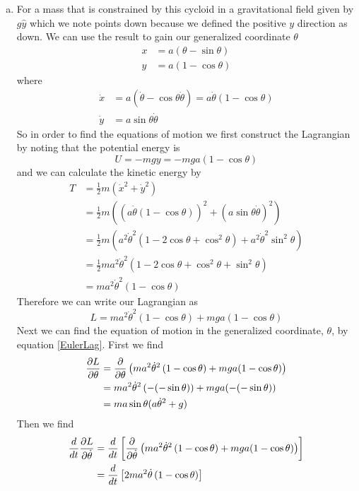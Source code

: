 \documentclass[11pt]{article}
\numberwithin{equation}{section}
\begin{document}
\begin{enumerate}[(a)]
\item For a mass that is constrained by this cycloid in a gravitational field given by
$g\hat{y}$ which we note points down because we defined the positive $y$ direction as 
down. We can use the result to gain our generalized coordinate $\theta$
\begin{align*}
x &=  a(\theta-\sin\theta)\\
y &=  a(1-\cos\theta)
\end{align*}
where
\begin{align*}
\dot{x} &=  a(\dot{\theta}-\cos\theta\dot{\theta}) =  a\dot{\theta}(1-\cos\theta)\\
\dot{y} &=  a\sin\theta\dot{\theta} 
\end{align*}
So in order to find the equations of motion we first construct the Lagrangian by noting that
the potential energy is
$$U = -mgy = -mga(1-\cos\theta)$$
and we can calculate the kinetic energy by
\begin{align*}
T &= \frac{1}{2}m\left(\dot{x}^2+\dot{y}^2\right)\\
&= \frac{1}{2}m\left((a\dot{\theta}(1-\cos\theta))^2+(a\sin\theta\dot{\theta})^2\right)\\
&= \frac{1}{2}m\left(a^2\dot{\theta}^2(1-2\cos\theta+\cos^2\theta)+a^2\dot{\theta}^2\sin^2\theta\right)\\
&= \frac{1}{2}ma^2\dot{\theta}^2\left(1-2\cos\theta+\cos^2\theta+\sin^2\theta\right)\\
&= ma^2\dot{\theta}^2\left(1-\cos\theta\right)
\end{align*}
Therefore we can write our Lagrangian as
$$L = ma^2\dot{\theta}^2\left(1-\cos\theta\right) + mga(1-\cos\theta)$$
Next we can find the equation of motion in the generalized coordinate, $\theta$, by equation
\ref{EulerLag}. First we find
\begin{align*}
\frac{\partial{L}}{\partial{\theta}} &= \frac{\partial{}}{\partial{\theta}}\left(ma^2\dot{\theta}^2\left(1-\cos\theta\right) + mga(1-\cos\theta)\right)\\
&= ma^2\dot{\theta}^2\left(-(-\sin\theta)\right) + mga(-(-\sin\theta))\\
&= ma\sin\theta(a\dot{\theta}^2+g)
\end{align*}
Then we find
\begin{align*}
\frac{d}{dt}\partiald{L}{\dot{\theta}} &= \frac{d}{dt}\left[\partiald{}{\dot{\theta}}\left(ma^2\dot{\theta}^2\left(1-\cos\theta\right) + mga(1-\cos\theta)\right)\right]\\
&= \frac{d}{dt}\left[2ma^2\dot{\theta}\left(1-\cos\theta\right)\right]\\

\end{align*}
\end{enumerate}
\end{document}
